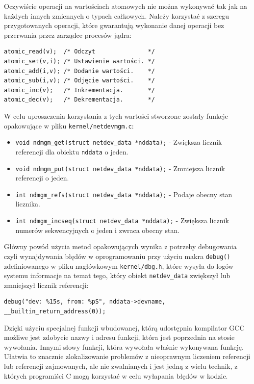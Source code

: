\documentclass[11pt]{scrartcl}
\begin{document}
Oczywiście operacji na wartościach atomowych nie można wykonywać tak jak na każdych innych zmiennych o typach całkowych. Należy korzystać z szeregu przygotowanych operacji, które gwarantują wykonanie danej operacji bez przerwania przez zarządce procesów jądra:

\newpage
\begin{verbatim}
atomic_read(v);  /* Odczyt               */
atomic_set(v,i); /* Ustawienie wartości. */
atomic_add(i,v); /* Dodanie wartości.    */
atomic_sub(i,v); /* Odjęcie wartości.    */
atomic_inc(v);   /* Inkrementacja.       */
atomic_dec(v);   /* Dekrementacja.       */
\end{verbatim}

W celu uproszczenia korzystania z tych wartości stworzone zostały funkcje opakowujące w pliku \texttt{kernel/netdevmgm.c}:

\begin{itemize}
\itemsep1pt\parskip0pt
\item
  \texttt{void ndmgm\_get(struct netdev\_data *nddata);} - Zwiększa licznik referencji dla obiektu \texttt{nddata} o jeden.
\item
  \texttt{void ndmgm\_put(struct netdev\_data *nddata);} - Zmniejsza licznik referencji o jeden.
\item
  \texttt{int ndmgm\_refs(struct netdev\_data *nddata);} - Podaje obecny stan licznika.
\item
  \texttt{int ndmgm\_incseq(struct netdev\_data *nddata);} - Zwiększa licznik numerów sekwencyjnych o jeden i zwraca obecny stan.
\end{itemize}

Główny powód użycia metod opakowujących wynika z potrzeby debugowania czyli wynajdywania błędów w oprogramowaniu przy użyciu makra \texttt{debug()} zdefiniowanego w pliku nagłówkowym \texttt{kernel/dbg.h}, które wysyła do logów systemu informacje na temat tego, który obiekt \texttt{netdev\_data} zwiększył lub zmniejszył licznik referencji:

\begin{verbatim}
debug("dev: %15s, from: %pS", nddata->devname, __builtin_return_address(0));
\end{verbatim}

Dzięki użyciu specjalnej funkcji wbudowanej, którą udostępnia kompilator GCC~\cite{returnaddr} możliwe jest zdobycie nazwy i adresu funkcji, która jest poprzednia na stosie wywołania. Innymi słowy funkcji, która wywołała właśnie wykonywana funkcję. Ułatwia to znacznie zlokalizowanie problemów z nieoprawnym liczeniem referencji lub referencji zajmowanych, ale nie zwalnianych i jest jedną z wielu technik, z których programiści C mogą korzystać w celu wyłapania błędów w kodzie.
\end{document}
